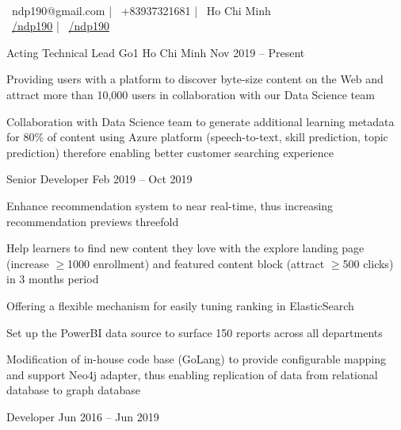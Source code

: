 \documentclass[]{awesome-cv}
\begin{document}
    
\begin{center}
	  \\
	\vspace{2mm}
	{\faEnvelope\ ndp190@gmail.com} | {\faMobile\ +83937321681} | {\faMapMarker\ Ho Chi Minh} \\
	{\faLinkedinSquare\ \href{https://www.linkedin.com/in/ndp190}{/ndp190}} | {\faGithubSquare\ \href{https://github.com/ndp190}{/ndp190}}
\end{center}

\begin{cventries}
	\cventry
	{Acting Technical Lead}
	{Go1}
	{Ho Chi Minh}
	{Nov 2019 – Present}
	{\begin{cvitems}
		\item {Providing users with a platform to discover byte-size content on the Web and attract more than 10,000 users in collaboration with our Data Science team}
		\item {Collaboration with Data Science team to generate additional learning metadata for 80\% of content using Azure platform (speech-to-text, skill prediction, topic prediction) therefore enabling better customer searching experience}
		\end{cvitems}}
	\cventry
	{Senior Developer}
	{}
	{}
	{Feb 2019 – Oct 2019}
	{\begin{cvitems}
		\item {Enhance recommendation system to near real-time, thus increasing recommendation previews threefold}
		\item {Help learners to find new content they love with the explore landing page (increase $\geq$1000 enrollment) and featured content block (attract $\geq$500 clicks) in 3 months period}
		\item {Offering a flexible mechanism for easily tuning ranking in ElasticSearch}
		\item {Set up the PowerBI data source to surface 150 reports across all departments}
		\item {Modification of in-house code base (GoLang) to provide configurable mapping and support Neo4j adapter, thus enabling replication of data from relational database to graph database}
		\end{cvitems}}
	\cventry
	{Developer}
	{}
	{}
	{Jun 2016 – Jun 2019}

\end{cventries}
\end{document}
